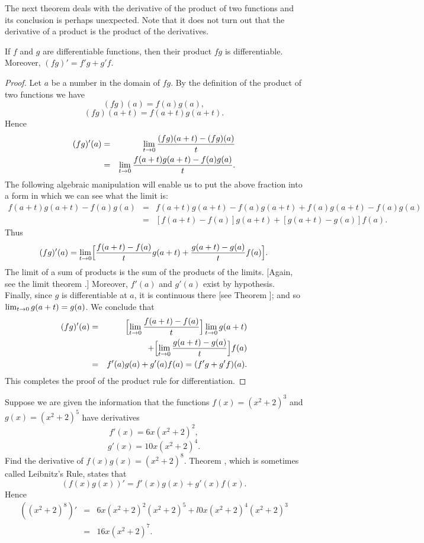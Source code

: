 The next theorem
deals with the derivative of the product of two functions
and its conclusion is perhaps unexpected.
Note that it does not turn out that the derivative of a product
is the product of the derivatives.

\begin{prop}\label{thm 1.7.4}
If $f$ and $g$ are differentiable functions,
then their product $fg$ is differentiable.
Moreover, $(fg)' = f'g + g'f$.
\end{prop}

\begin{proof}
Let $a$ be a number in the domain of $fg$.
By the definition of the product of two functions we have
\[
(fg)(a) = f(a)g(a),
\]
\[
(fg)(a + t) = f(a + t)g(a + t).
\]
Hence
\begin{eqnarray*}
(fg)'(a)
&=&
\lim_{t \rightarrow 0} {\frac{(fg)(a + t) - (fg)(a)}{t} }  \\
&=&
\lim_{t \rightarrow 0} {\frac{f(a + t)g(a + t) - f(a)g(a)}{t} }.  
\end{eqnarray*}
The following algebraic manipulation
will enable us to put the above fraction
into a form in which we can see what the limit is:
\begin{eqnarray*} 
f(a + t)g(a + t) - f(a)g(a)
&=& f(a + t)g(a + t) - f(a)g(a + t) + f(a)g(a + t) - f(a)g(a) \\
&=& [f(a + t) - f(a)] g(a + t) + [g(a + t) - g(a)] f(a). 
\end{eqnarray*}
Thus
$$
(fg)'(a) =
\lim_{t \rightarrow 0}
\Bigl[{ \frac{f(a + t) - f(a)}{t} } g(a + t) +
{\frac{g(a + t) - g(a)}{t}} f(a) \Bigr].
$$
The limit of a sum of products is the sum of the products of the limits.
[Again, see the limit theorem .]
Moreover, $f'(a)$ and $g'(a)$ exist by hypothesis.
Finally, since $g$ is differentiable at $a$,
it is continuous there
[see Theorem ];
and so $\lim_{t \rightarrow 0} {g(a + t) = g(a)}$.
We conclude that
\begin{eqnarray*}
(fg)'(a)
&=& \Bigl[ \lim_{t \rightarrow 0} {\frac{f(a + t) - f(a)}{t}} \Bigr] 
\lim_{t \rightarrow 0} {g(a + t)}   \\
& &  +
\Bigl[ \lim_{t \rightarrow 0}
{\frac{g(a + t) - g(a)}{t}} \Bigr] f(a)  \\
&=& f'(a)g(a) + g'(a)f(a) = (f'g + g'f)(a).
\end{eqnarray*}
This completes the proof of the product rule for differentiation.
\end{proof}

\begin{example}
\label{exam 1.7.2}
Suppose we are given the information that
the functions $f(x) = (x^2 + 2)^3$ and $g(x) = (x^2 + 2)^5$
have derivatives
\[
f'(x) = 6x(x^2 + 2)^2, 
\]
\[
g'(x) = 10x(x^2 + 2)^4.
\]
Find the derivative of $f(x)g(x) = (x^2 + 2)^8$.
Theorem ,
which is sometimes called Leibnitz's Rule,
states that
$$
(f(x)g(x))' = f'(x)g(x) + g'(x)f(x).
$$
Hence
\begin{eqnarray*} 
((x^2 + 2)^8)'
&=&
6x(x^2 + 2)^2(x^2 + 2)^5 + l0x(x^2 + 2)^4(x^2 + 2)^3  \\
&=& 16x(x^2 + 2)^7.
\end{eqnarray*}
\end{example}

